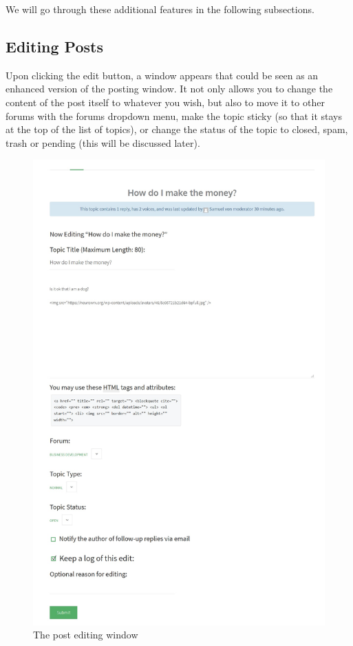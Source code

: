 \documentclass[10pt]{article}
\begin{document}
\begin{flushleft}
We will go through these additional features in the following subsections. 
\end{flushleft}

\subsection{Editing Posts}

\begin{flushleft}
Upon clicking the edit button, a window appears that could be seen as an enhanced version of the posting window.  It not only allows you to change the content of the post itself to whatever you wish, but also to move it to other forums with the forums dropdown menu, make the topic sticky (so that it stays at the top of the list of topics), or change the status of the topic to closed, spam, trash or pending (this will be discussed later). 
\end{flushleft}

\begin{figure}[H]
    \centering
    \includegraphics[scale=0.3]{images/editpost.jpg}
    \caption{The post editing window}
    \label{editpost}
\end{figure}
\end{document}
